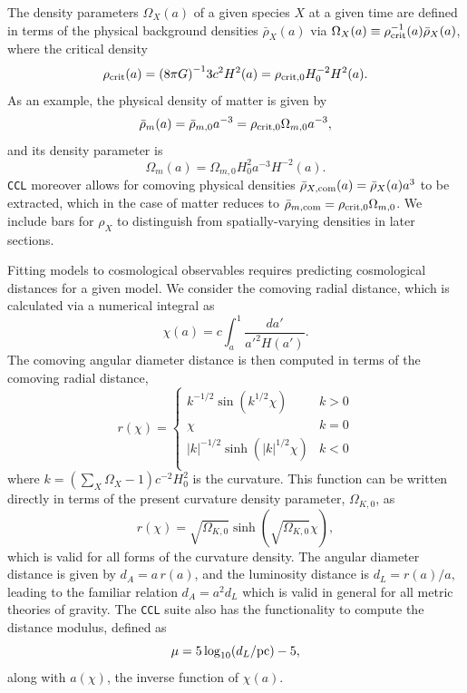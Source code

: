 \documentclass[\docopts]{\docclass}
\newcommand{\ccl}{{\tt CCL}\xspace}
\begin{document}
The density parameters $\Omega_X(a)$ of a given species $X$ at a given time are defined in terms of the physical background densities $\bar\rho_X(a)$ via $\Omega_X(a) \equiv \rho^{-1}_{\rm crit}(a) \bar\rho_X(a)$, where the critical density
\begin{equation}
  \rho_{\rm crit}(a) = {( 8 \pi G)}^{-1} 3c^2H^2(a) = \rho_{\rm crit,0} H_0^{-2} H^2(a).
\end{equation}
As an example, the physical density of matter is given by
\begin{equation}
  \bar\rho_m(a) = \bar\rho_{m,0} a^{-3} = \rho_{\rm crit,0} \Omega_{m,0} a^{-3},
\end{equation}
and its density parameter is
\begin{equation}
  \Omega_m(a) = \Omega_{m,0} H_0^{2} a^{-3} H^{-2}(a).
\end{equation}
\ccl moreover allows for comoving physical densities $\bar\rho_{X, {\rm com}}(a) = \bar\rho_X(a) a^3$ to be extracted, which in the case of matter reduces to $\bar\rho_{m, {\rm com}} = \rho_{\rm crit,0} \Omega_{m,0}$. We include bars for $\rho_X$ to distinguish from spatially-varying densities in later sections.

Fitting models to cosmological observables requires predicting cosmological distances for a given model. We consider the comoving radial distance, which is calculated via a numerical integral as
\begin{equation}
 \chi(a)= c \int_a^1 \frac{da'}{a'^2 H(a')}.
 \label{eq:comrdist}
\end{equation}
The comoving angular diameter distance is then computed in terms of the comoving radial distance,
\begin{equation}\label{eq:angdist}
 r(\chi)=\left\{\begin{array}{cc}
                 k^{-1/2}\sin(k^{1/2}\chi) & k>0\\
                 \chi & k=0\\
                 |k|^{-1/2}\sinh(|k|^{1/2}\chi) & k<0\\
                \end{array}\right.
\end{equation}
where $k = \left({\sum_X \Omega_X -1}\right) c^{-2} H_0^2$ is the curvature.
This function can be written directly in terms of the present curvature density parameter, $\Omega_{K,0}$, as
\begin{equation}\label{eq:angdist_omegak}
 r(\chi) = \sqrt{\Omega_{K,0}}\sinh(\sqrt{\Omega_{K,0}}\chi),
\end{equation}
which is valid for all forms of the curvature density.
The angular diameter distance is given by $d_A=a\,r(a)$, and the luminosity distance is
$d_L=r(a)/a,$ leading to the familiar relation $d_A = a^2d_L$ which is valid in general for all metric theories of gravity.
The \ccl suite also has the functionality to compute the distance modulus, defined as
\begin{equation}\label{eq:distmod}
    \mu = 5 \log_{10}(d_L / {\rm pc})-5,
\end{equation}
along with $a(\chi)$, the inverse function of $\chi(a)$.
\end{document}
